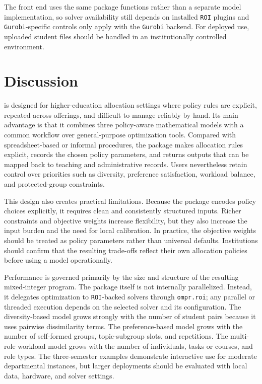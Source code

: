 The front end uses the same package functions rather than a separate model
implementation, so solver availability still depends on installed \texttt{ROI} plugins
and \texttt{Gurobi}-specific controls only apply with the \texttt{Gurobi} backend. For
deployed use, uploaded student files should be handled in an institutionally
controlled environment.

\section{Discussion}\label{sec-discussion}

 is designed for higher-education allocation settings where policy
rules are explicit, repeated across offerings, and difficult to manage reliably
by hand. Its main advantage is that it combines three policy-aware mathematical
models with a common workflow over general-purpose optimization tools. Compared
with spreadsheet-based or informal procedures, the package makes allocation rules
explicit, records the chosen policy parameters, and returns outputs that can be
mapped back to teaching and administrative records. Users nevertheless retain
control over priorities such as diversity, preference satisfaction, workload
balance, and protected-group constraints.

This design also creates practical limitations. Because the package encodes
policy choices explicitly, it requires clean and consistently structured inputs.
Richer constraints and objective weights increase flexibility, but they also
increase the input burden and the need for local calibration. In practice, the
objective weights should be treated as policy parameters rather than universal
defaults. Institutions should confirm that the resulting trade-offs reflect
their own allocation policies before using a model operationally.

Performance is governed primarily by the size and structure of the resulting
mixed-integer program. The package itself is not internally parallelized.
Instead, it delegates optimization to \texttt{ROI}-backed solvers through \texttt{ompr.roi};
any parallel or threaded execution depends on the selected solver and its
configuration. The diversity-based model grows strongly with the number of
student pairs because it uses pairwise dissimilarity terms. The preference-based
model grows with the number of self-formed groups, topic-subgroup slots, and
repetitions. The multi-role workload model grows with the number of individuals,
tasks or courses, and role types. The three-semester examples demonstrate
interactive use for moderate departmental instances, but larger deployments
should be evaluated with local data, hardware, and solver settings.

